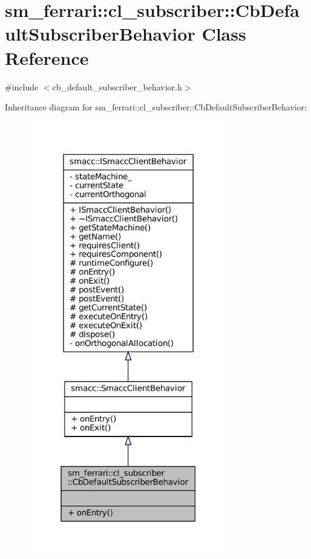 \hypertarget{classsm__ferrari_1_1cl__subscriber_1_1CbDefaultSubscriberBehavior}{}\section{sm\+\_\+ferrari\+:\+:cl\+\_\+subscriber\+:\+:Cb\+Default\+Subscriber\+Behavior Class Reference}
\label{classsm__ferrari_1_1cl__subscriber_1_1CbDefaultSubscriberBehavior}


{\ttfamily \#include $<$cb\+\_\+default\+\_\+subscriber\+\_\+behavior.\+h$>$}



Inheritance diagram for sm\+\_\+ferrari\+:\+:cl\+\_\+subscriber\+:\+:Cb\+Default\+Subscriber\+Behavior\+:
\nopagebreak
\begin{figure}[H]
\begin{center}
\leavevmode
\includegraphics[width=246pt]{classsm__ferrari_1_1cl__subscriber_1_1CbDefaultSubscriberBehavior__inherit__graph}
\end{center}
\end{figure}


